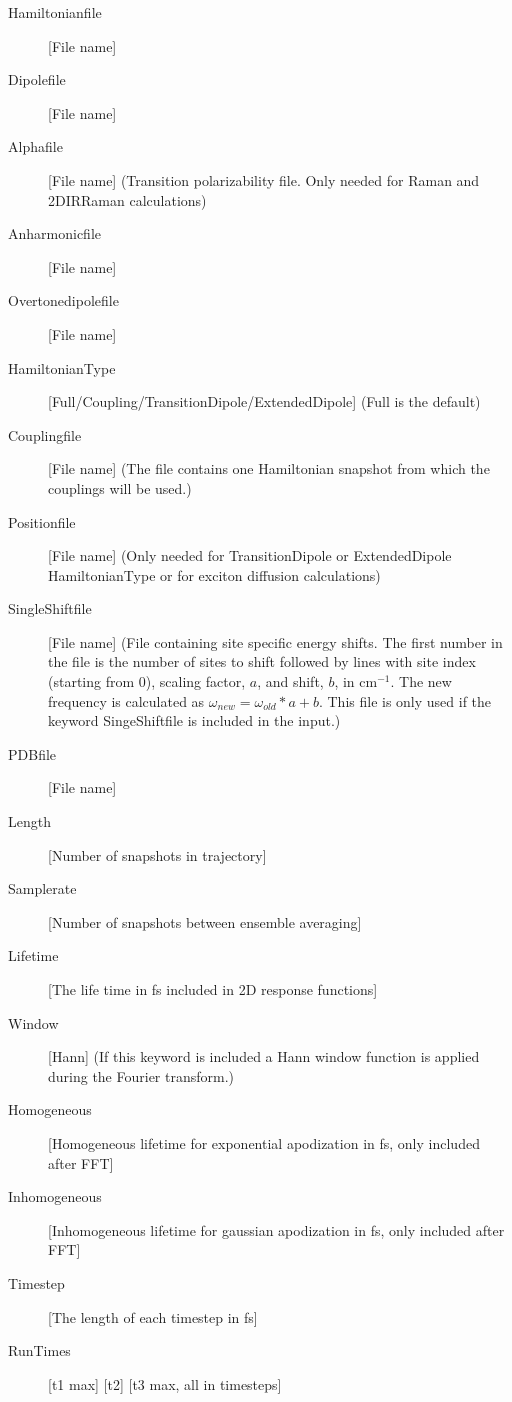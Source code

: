 \begin{description}
\item [Hamiltonianfile] [File name]
\item [Dipolefile] [File name]
\item [Alphafile] [File name] (Transition polarizability file. Only needed for Raman and 2DIRRaman calculations)
\item [Anharmonicfile] [File name]
\item [Overtonedipolefile] [File name]
\item [HamiltonianType] [Full/Coupling/TransitionDipole/ExtendedDipole] (Full is the default)
\item [Couplingfile] [File name] (The file contains one Hamiltonian snapshot from which the couplings will be used.)
\item [Positionfile] [File name] (Only needed for TransitionDipole or ExtendedDipole HamiltonianType or for exciton diffusion calculations)
\item [SingleShiftfile] [File name] (File containing site specific energy shifts.
The first number in the file is the number of sites to shift followed by lines with site index (starting from 0),
scaling factor, $a$, and shift, $b$, in cm$^{-1}$. The new frequency is calculated as $\omega_{{new}}=\omega_{{old}}*a+b$.  This file is only used if the keyword SingeShiftfile is included in the input.)
\item [PDBfile] [File name]
\item [Length] [Number of snapshots in trajectory] 
\item [Samplerate] [Number of snapshots between ensemble averaging]
\item [Lifetime] [The life time in fs included in 2D response functions]
\item [Window] [Hann] (If this keyword is included a Hann window function is applied during the Fourier transform.)
\item [Homogeneous] [Homogeneous lifetime for exponential apodization in fs, only included after FFT]
\item [Inhomogeneous] [Inhomogeneous lifetime for gaussian apodization in fs, only included after FFT]
\item [Timestep] [The length of each timestep in fs]
\item [RunTimes] [t1 max] [t2] [t3 max, all in timesteps]

\end{description}
